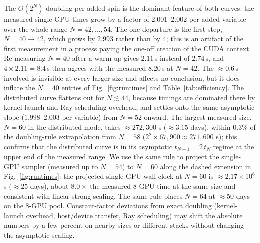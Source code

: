 \documentclass[preprint,12pt,a4paper]{elsarticle}
\begin{document}
The $O(2^N)$ doubling per added spin is the dominant feature of both curves: the
measured single-GPU times grow by a factor of $2.001$--$2.002$ per added variable
over the whole range $N=42,\dots,54$. The one departure is the first step,
$N=40\to42$, which grows by $2.993$ rather than by $4$; this is an artifact of the
first measurement in a process paying the one-off creation of the CUDA context.
Re-measuring $N=40$ after a warm-up gives $2.11$\,s instead of $2.74$\,s, and
$4\times 2.11=8.4$\,s then agrees with the measured $8.20$\,s at $N=42$. The
$\approx\!0.6$\,s involved is invisible at every larger size and affects no
conclusion, but it does inflate the $N=40$ entries of Fig.~\ref{fig:runtimes} and
Table~\ref{tab:efficiency}. The distributed curve flattens out for $N \lesssim 44$,
because timings are dominated there by kernel-launch and Ray-scheduling overhead,
and settles onto the same asymptotic slope ($1.998$--$2.003$ per variable) from
$N=52$ onward. The largest measured size, $N=60$ in the distributed mode, takes
$\approx\!272{,}300$ s ($\approx 3.15$ days), within $0.3\%$ of the
doubling-rule extrapolation from $N=58$ ($2^{2}\!\times\!67{,}900 \approx
271{,}600$ s); this confirms that the distributed curve is in its asymptotic
$t_{N+1}=2\,t_N$ regime at the upper end of the measured range. We use the same rule to project
the single-GPU sampler (measured
up to $N=54$) to $N=60$ along the dashed extension in Fig.~\ref{fig:runtimes}:
the projected single-GPU wall-clock at $N=60$ is $\approx\!2.17\times 10^{6}$ s
($\approx\!25$ days), about $8.0\times$ the measured 8-GPU time at the same size
and consistent with linear strong scaling. The same rule places $N=64$ at
$\approx\!50$ days on the 8-GPU pool. Constant-factor deviations from exact
doubling (kernel-launch overhead, host/device transfer, Ray scheduling) may shift
the absolute numbers by a few percent on nearby sizes or different stacks without changing the
asymptotic scaling.
\end{document}

